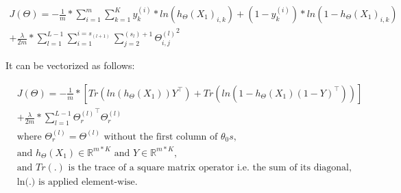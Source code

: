 \documentclass[a4paper, 12pt]{article}
\begin{document}
\begin{equation}
\begin{split}
J(\Theta) = -\frac{1}{m} * \sum_{i=1}^{m} \sum_{k=1}^{K} y_{k}^{(i)} * ln({h_{\Theta}(X_{1})}_{i,k}) + (1-y_{k}^{(i)}) * ln(1-{h_{\Theta}(X_{1})}_{i,k}) \\
+ \frac{\lambda}{2m} * \sum_{l=1}^{L-1} \sum_{i=1}^{i=s_{(l+1)}} \sum_{j=2}^{(s_{l})+1} {\Theta^{(l)}_{i,j}}^{2}
\end{split}
\end{equation}

It can be vectorized as follows:

\begin{align*}
& J(\Theta) = -\frac{1}{m}  * \left[ Tr \left(ln(h_{\Theta}(X_{1}))Y^{\top}\right) + Tr\left(ln(1-h_{\Theta}(X_{1})(1-Y)^{\top}) \right) \right] \\
& + \frac{\lambda}{2m}*\sum_{l=1}^{L-1}{\Theta_{r}^{(l)}}^{\top}\Theta_{r}^{(l)} \\
& \text{where } \Theta_{r}^{(l)} = \Theta^{(l)} \text{ without the first column of }\theta_0s, \\
& \text{and }  h_{\Theta}(X_{1}) \in \mathbb{R}^{m*K} \text{ and } Y \in \mathbb{R}^{m*K}, \\
& \text{and } Tr(.) \text{ is the trace of a square matrix operator i.e. the sum of its diagonal}, \\
& \text{ln(.) is applied element-wise}. 
\end{align*}
\end{document}
